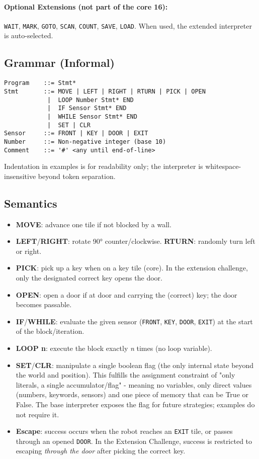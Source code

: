 \documentclass[11pt,a4paper]{article}
\begin{document}
\paragraph{Optional Extensions (not part of the core 16):} \texttt{WAIT}, \texttt{MARK}, \texttt{GOTO}, \texttt{SCAN}, \texttt{COUNT}, \texttt{SAVE}, \texttt{LOAD}. When used, the extended interpreter is auto-selected.

\subsection{Grammar (Informal)}
\begin{verbatim}
Program    ::= Stmt*
Stmt       ::= MOVE | LEFT | RIGHT | RTURN | PICK | OPEN
            |  LOOP Number Stmt* END
            |  IF Sensor Stmt* END
            |  WHILE Sensor Stmt* END
            |  SET | CLR
Sensor     ::= FRONT | KEY | DOOR | EXIT
Number     ::= Non-negative integer (base 10)
Comment    ::= '#' <any until end-of-line>
\end{verbatim}

Indentation in examples is for readability only; the interpreter is whitespace-insensitive beyond token separation.

\subsection{Semantics}
\begin{itemize}[noitemsep]
  \item \textbf{MOVE}: advance one tile if not blocked by a wall.
  \item \textbf{LEFT}/\textbf{RIGHT}: rotate 90° counter/clockwise. \textbf{RTURN}: randomly turn left or right.
  \item \textbf{PICK}: pick up a key when on a key tile (core). In the extension challenge, only the designated correct key opens the door.
  \item \textbf{OPEN}: open a door if at door and carrying the (correct) key; the door becomes passable.
  \item \textbf{IF}/\textbf{WHILE}: evaluate the given sensor (\texttt{FRONT}, \texttt{KEY}, \texttt{DOOR}, \texttt{EXIT}) at the start of the block/iteration.
  \item \textbf{LOOP n}: execute the block exactly \textit{n} times (no loop variable).
  \item \textbf{SET}/\textbf{CLR}: manipulate a single boolean flag (the only internal state beyond the world and position). This fulfills the assignment constraint of "only literals, a single accumulator/flag" - meaning no variables, only direct values (numbers, keywords, sensors) and one piece of memory that can be True or False. The base interpreter exposes the flag for future strategies; examples do not require it.
  \item \textbf{Escape}: success occurs when the robot reaches an \texttt{EXIT} tile, or passes through an opened \texttt{DOOR}. In the Extension Challenge, success is restricted to escaping \emph{through the door} after picking the correct key.
\end{itemize}
\end{document}
